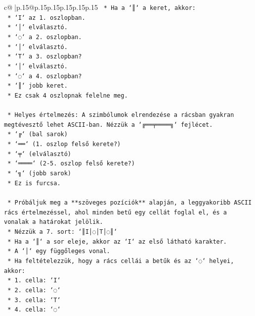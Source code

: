 \documentclass{article}
\begin{document}
{\begin{supertabular}{c@{$\;$}|p{.15\linewidth}@{}p{.15\linewidth}p{.15\linewidth}p{.15\linewidth}p{.15\linewidth}p{.15\linewidth}}
{{{\texttt{        *   Ha a `║` a keret, akkor:} \\
\texttt{            *   `I` az 1. oszlopban.} \\
\texttt{            *   `│` elválasztó.} \\
\texttt{            *   `◌` a 2. oszlopban.} \\
\texttt{            *   `│` elválasztó.} \\
\texttt{            *   `T` a 3. oszlopban?} \\
\texttt{            *   `│` elválasztó.} \\
\texttt{            *   `◌` a 4. oszlopban?} \\
\texttt{            *   `║` jobb keret.} \\
\texttt{        *   Ez csak 4 oszlopnak felelne meg.} \\
\\ 
\texttt{    *   Helyes értelmezés: A szimbólumok elrendezése a rácsban gyakran megtévesztő lehet ASCII{-}ban. Nézzük a `╔══╤════╗` fejlécet.} \\
\texttt{        *   `╔` (bal sarok)} \\
\texttt{        *   `══` (1. oszlop felső kerete?)} \\
\texttt{        *   `╤` (elválasztó)} \\
\texttt{        *   `════` (2{-}5. oszlop felső kerete?)} \\
\texttt{        *   `╗` (jobb sarok)} \\
\texttt{        *   Ez is furcsa.} \\
\\ 
\texttt{    *   Próbáljuk meg a **szöveges pozíciók** alapján, a leggyakoribb ASCII rács értelmezéssel, ahol minden betű egy cellát foglal el, és a vonalak a határokat jelölik.} \\
\texttt{    *   Nézzük a 7. sort: `║I│◌│T│◌║`} \\
\texttt{        *   Ha a `║` a sor eleje, akkor az `I` az első látható karakter.} \\
\texttt{        *   A `│` egy függőleges vonal.} \\
\texttt{        *   Ha feltételezzük, hogy a rács cellái a betűk és az `◌` helyei, akkor:} \\
\texttt{            *   1. cella: `I`} \\
\texttt{            *   2. cella: `◌`} \\
\texttt{            *   3. cella: `T`} \\
\texttt{            *   4. cella: `◌`} \\
}}}
\end{supertabular}}
\end{document}
